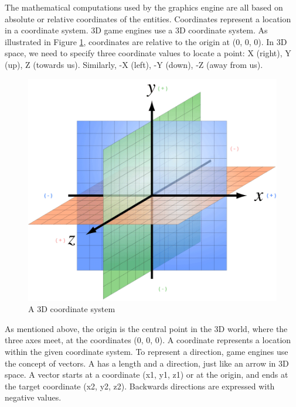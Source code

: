 The mathematical computations used by the graphics engine are all based on absolute or relative coordinates of the entities. Coordinates represent a location in a coordinate system. 3D game engines use a 3D coordinate system. As illustrated in Figure \ref{fig:3d_coordinates_system}, coordinates are relative to the origin at (0, 0, 0). In 3D space, we need to specify three coordinate values to locate a point: X (right), Y (up), Z (towards us). Similarly, -X (left), -Y (down), -Z (away from us).\\
\begin{figure}[H]
	\centering
	\includegraphics[width=\linewidth]{gfx/Chapter3/coordinate_system}
	\caption{A 3D coordinate system \cite{jme3_terminology:online}}
	\label{fig:3d_coordinates_system}
\end{figure}

As mentioned above, the origin is the central point in the 3D world, where the three axes meet, at the coordinates (0, 0, 0). A coordinate represents a location within the given coordinate system. To represent a direction, game engines use the concept of vectors. A \emph{} has a length and a direction, just like an arrow in 3D space. A vector starts at a coordinate (x1, y1, z1) or at the origin, and ends at the target coordinate (x2, y2, z2). Backwards directions are expressed with negative values.\\

